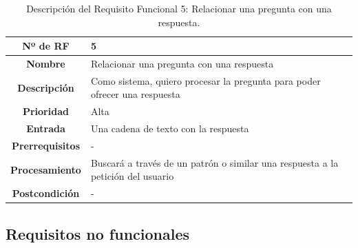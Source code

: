 \begin{table}[H]
	\centering
	\begin{tabularx}{\textwidth}{|c|X|} 
		\hline
		\textbf{Nº de RF }          &  5 \\ 
		\hline
		\textbf{Nombre}         &  Relacionar una pregunta con una respuesta  \\ 
		\hline
		\textbf{Descripción}    &  Como sistema, quiero procesar la pregunta para poder ofrecer una respuesta \\ 
		\hline
		\textbf{Prioridad}      &  Alta  \\ 
		\hline
		\textbf{Entrada}        & Una cadena de texto con la respuesta  \\ 
		\hline
		\textbf{Prerrequisitos} & - \\ 
		\hline
		\textbf{Procesamiento}  &  Buscará a través de un patrón o similar una respuesta a la petición del usuario \\ 
		\hline
		\textbf{Postcondición}  &  - \\
		\hline
	\end{tabularx}
	\caption{Descripción del Requisito Funcional 5: Relacionar una pregunta con una respuesta.}
\end{table}

\subsection{Requisitos no funcionales}

